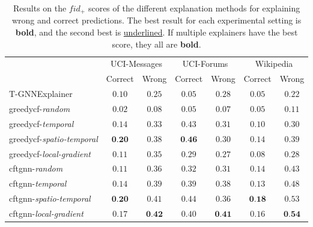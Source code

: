 \begin{table}[ht]
    \centering
    \small
    \begin{tabular}{lcccccc}
    \hline
         &  \multicolumn{2}{c}{UCI-Messages}&  \multicolumn{2}{c}{UCI-Forums}&  \multicolumn{2}{c}{Wikipedia}\\
         &  Correct&  Wrong&  Correct&  Wrong&  Correct& Wrong\\
         \hline
         T-GNNExplainer&  $0.10$&  $0.25$&  $0.05$&  $0.28$&  $0.05$& $0.22$\\
         \gls{greedycf}-\textit{random}&  $0.02$&  $0.08$&  $0.05$&  $0.07$&  $0.05$& $0.11$\\
         \gls{greedycf}-\textit{temporal}&  $0.14$&  $0.33$&  $0.43$&  $0.31$&  $0.10$& $0.30$\\
         \gls{greedycf}-\textit{spatio-temporal}&  $\textbf{0.20}$&  $0.38$&  $\textbf{0.46}$&  $0.30$&  $0.14$& $0.39$\\
         \gls{greedycf}-\textit{local-gradient}&  $0.11$&  $0.35$&  $0.29$&  $0.27$&  $0.08$& $0.28$\\
         \gls{cftgnn}-\textit{random}&  $0.11$&  $0.36$&  $0.32$&  $0.31$&  $0.14$& $0.43$\\
         \gls{cftgnn}-\textit{temporal}&  $0.14$&  $0.39$&  $0.39$&  \underline{$0.38$}&  $0.13$& $0.48$\\
         \gls{cftgnn}-\textit{spatio-temporal}&  $\textbf{0.20}$&  \underline{$0.41$}&  \underline{$0.44$}&  $0.36$&  $\textbf{0.18}$& \underline{$0.53$}\\
 \gls{cftgnn}-\textit{local-gradient}& $0.17$& $\textbf{0.42}$& $0.40$& $\textbf{0.41}$& \underline{$0.16$}&$\textbf{0.54}$\\
 \hline
    \end{tabular}
    \caption{Results on the $fid_+$ scores of the different explanation methods for explaining wrong and correct predictions. The best result for each experimental setting is \textbf{bold}, and the second best is \underline{underlined}. If multiple explainers have the best score, they all are \textbf{bold}.}
    \label{t_fid_plus}
\end{table}


